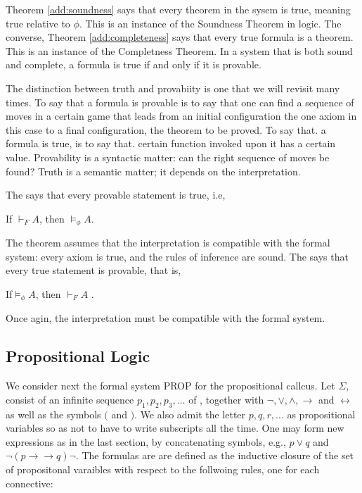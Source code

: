 Theorem \ref{add:soundness} says that every theorem in the sysem  is true, meaning true relative to $\phi$.  This is an instance of the Soundness Theorem in logic.
The converse, Theorem \ref{add:completeness} says that every true formula is a theorem.  This is an instance of the Completness Theorem.    In a system that is both sound and complete, a formula is true if and only if it is provable.

The distinction between truth and provabiity is one that we will revisit many times.  To say that a formula is provable is to say that one can find a sequence of moves in a certain game that leads from an initial configuration \mdash  the one axiom in this case \mdash to a final configuration, the theorem to be proved.  To say that. a formula is true, is to say that. certain function invoked upon it has a  certain value.  Provability is a syntactic matter: can the right sequence of moves be found?  Truth is a semantic matter; it depends on the interpretation.




The  says that every provable statement is true, i.e,

\begin{indent}
If $\vdash_F A$, then $\models_\phi A$.
\end{indent}

The theorem assumes that the interpretation is compatible with the formal system: every axiom is true, and the rules of inference are sound. The  says that every true statement is provable, that is,

\begin{indent}
If$\models_\phi A$, then $\vdash_F A$ .
\end{indent}

Once agin, the interpretation must be compatible with the formal system.

\subsection{Propositional Logic}

We consider next the formal system PROP for the propositional callcus.  Let $\Sigma$, consist of an infinite sequence $ p_1, p_2, p_3, \dots$ of , together with   $\neg, \lor, \land, \to$ and $\leftrightarrow$ as well as the symbols $($ and $)$. We also admit the letter $p, q, r, \ldots$ as propositional variables so as not to have to write subscripts all the time.  One may form new expressions as in the last section, by concatenating symbols, e.g., $p \lor q$ and $\neg (p \to\to q) \neg$. The formulas are are defined as the inductive closure of the set of propositonal varaibles with respect to the follwoing rules, one for each connective:

